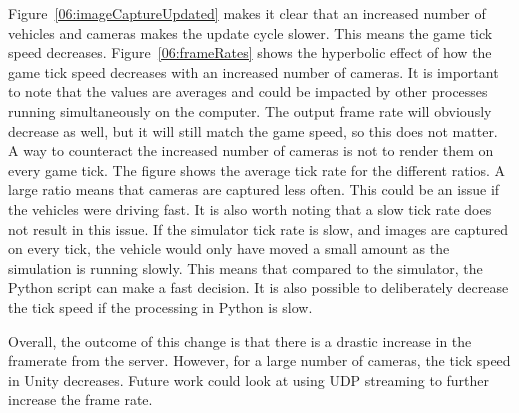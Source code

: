 Figure~\ref{06:imageCaptureUpdated} makes it clear that an increased number of vehicles and cameras makes the update cycle slower. This means the game tick speed decreases. Figure~\ref{06:frameRates} shows the hyperbolic effect of how the game tick speed decreases with an increased number of cameras. It is important to note that the values are averages and could be impacted by other processes running simultaneously on the computer. The output frame rate will obviously decrease as well, but it will still match the game speed, so this does not matter. A way to counteract the increased number of cameras is not to render them on every game tick. The figure shows the average tick rate for the different ratios. A large ratio means that cameras are captured less often. This could be an issue if the vehicles were driving fast. It is also worth noting that a slow tick rate does not result in this issue. If the simulator tick rate is slow, and images are captured on every tick, the vehicle would only have moved a small amount as the simulation is running slowly. This means that compared to the simulator, the Python script can make a fast decision. It is also possible to deliberately decrease the tick speed if the processing in Python is slow. 

Overall, the outcome of this change is that there is a drastic increase in the framerate from the server. However, for a large number of cameras, the tick speed in Unity decreases. Future work could look at using UDP streaming to further increase the frame rate.  

